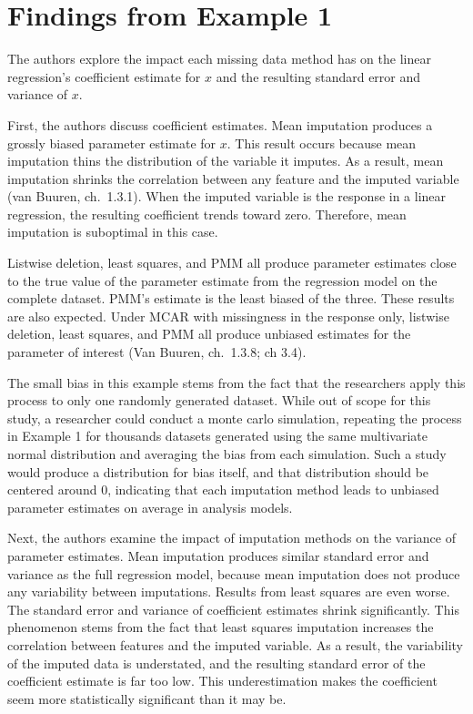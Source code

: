 \documentclass[12pt,oneside]{chicagocapstone}
\begin{document}
\section*{Findings from Example 1}\label{findings-from-example-1}

The authors explore the impact each missing data method has on the
linear regression's coefficient estimate for \(x\) and the resulting
standard error and variance of \(x\).

First, the authors discuss coefficient estimates. Mean imputation
produces a grossly biased parameter estimate for \(x\). This result
occurs because mean imputation thins the distribution of the variable it
imputes. As a result, mean imputation shrinks the correlation between
any feature and the imputed variable (van Buuren, ch.~1.3.1). When the
imputed variable is the response in a linear regression, the resulting
coefficient trends toward zero. Therefore, mean imputation is suboptimal
in this case.

Listwise deletion, least squares, and PMM all produce parameter
estimates close to the true value of the parameter estimate from the
regression model on the complete dataset. PMM's estimate is the least
biased of the three. These results are also expected. Under MCAR with
missingness in the response only, listwise deletion, least squares, and
PMM all produce unbiased estimates for the parameter of interest (Van
Buuren, ch.~1.3.8; ch 3.4).

The small bias in this example stems from the fact that the researchers
apply this process to only one randomly generated dataset. While out of
scope for this study, a researcher could conduct a monte carlo
simulation, repeating the process in Example 1 for thousands datasets
generated using the same multivariate normal distribution and averaging
the bias from each simulation. Such a study would produce a distribution
for bias itself, and that distribution should be centered around 0,
indicating that each imputation method leads to unbiased parameter
estimates on average in analysis models.

Next, the authors examine the impact of imputation methods on the
variance of parameter estimates. Mean imputation produces similar
standard error and variance as the full regression model, because mean
imputation does not produce any variability between imputations. Results
from least squares are even worse. The standard error and variance of
coefficient estimates shrink significantly. This phenomenon stems from
the fact that least squares imputation increases the correlation between
features and the imputed variable. As a result, the variability of the
imputed data is understated, and the resulting standard error of the
coefficient estimate is far too low. This underestimation makes the
coefficient seem more statistically significant than it may be.
\end{document}
